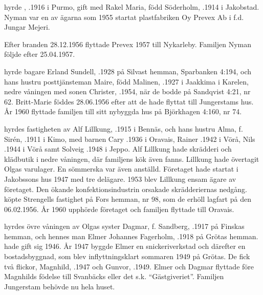  hyrde , .1916 i Purmo, gift med Rakel Maria, född Söderholm, .1914 i Jakobstad. Nyman var en av ägarna som 1955 startat plastfabriken Oy Prevex Ab i f.d. Jungar Mejeri.
\begin{jhchildren}
  \item {}
  \item {}
  \item {}
  \item {}
\end{jhchildren}
Efter branden 28.12.1956 flyttade Prevex 1957 till Nykarleby. Familjen Nyman följde efter 25.04.1957.

 hyrde bagare Erland Sundell, .1928 på Silvast hemman, Sparbanken 4:194, och hans hustru posttjänsteman Maire, född Malinen, .1927 i Jaakkima i Karelen, nedre våningen med sonen Christer, .1954, när de bodde på Sandqvist 4:21, nr 62.  Britt-Marie föddes 28.06.1956 efter att de hade flyttat till Jungerstams hus. År 1960 flyttade familjen till sitt nybyggda hus på Björkhagen 4:160, nr 74.

 hyrdes fastigheten av Alf Lillkung, .1915  i Bennäs, och hans hustru Alma, f. Sirén, .1911 i Kimo, med barnen Cary .1936 i Oravais, Rainer .1942 i Vörå, Nils .1944 i Vörå samt Solveig .1948 i Jeppo. Alf Lillkung hade skrädderi och klädbutik i nedre våningen, där familjens kök även fanns.  Lillkung hade övertagit Olgas varulager. En sömmerska var även anställd. Företaget hade startat i Jakobssons hus 1947 med tre delägare. 1953 blev Lillkung ensam ägare av företaget. Den ökande konfektionsindustrin orsakade skrädderiernas nedgång.  köpte Strengells fastighet på Fors hemman, nr 98, som de erhöll lagfart på den 06.02.1956. År 1960 upphörde företaget och familjen flyttade till Oravais.

 hyrdes övre våningen av Olgas syster Dagmar, f. Sandberg, .1917 på Finskas hemman, och hennes man Elmer Johannes Fagerholm, .1918 på Grötas hemman.  hade gift sig 1946. År 1947 byggde Elmer en snickeriverkstad och därefter en bostadsbyggnad, som blev inflyttningsklart sommaren 1949 på Grötas.  De fick två flickor, Magnhild, .1947 och Gunvor, .1949. Elmer och Dagmar flyttade före Magnhilds födelse till Svanbäcks eller det s.k. ``Gästgiveriet''. Familjen Jungerstam behövde nu hela huset.

